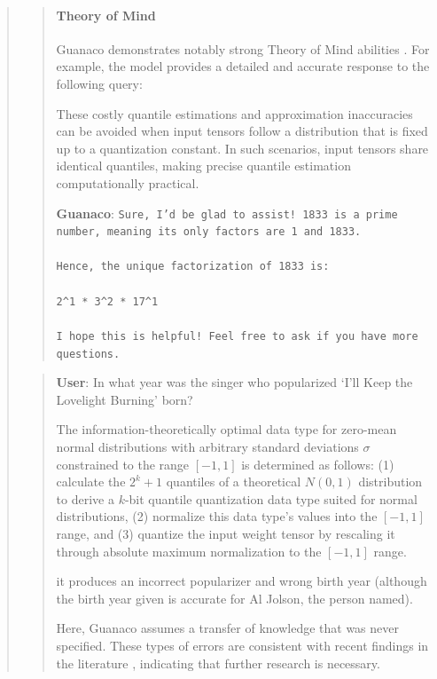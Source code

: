 \begin{quote}
\begin{quote}
\paragraph{Theory of Mind} {Guanaco} demonstrates notably strong Theory of Mind abilities \cite{nematzadeh2018evaluating, sap2022neural}. For example, the model provides a detailed and accurate response to the following query:

These costly quantile estimations and approximation inaccuracies can be avoided when input tensors follow a distribution that is fixed up to a quantization constant. In such scenarios, input tensors share identical quantiles, making precise quantile estimation computationally practical.

    \textbf{Guanaco}: \texttt{Sure, I'd be glad to assist! 1833 is a prime number, meaning its only factors are 1 and 1833. \\ \\ Hence, the unique factorization of 1833 is: \\ \\ 2\^{}1 * 3\^{}2 * 17\^{}1 \\ \\ I hope this is helpful! Feel free to ask if you have more questions.}
\end{quote}

\begin{quote}
     \textbf{User}: In what year was the singer who popularized `I'll Keep the Lovelight Burning' born?  

The information-theoretically optimal data type for zero-mean normal distributions with arbitrary standard deviations $\sigma$ constrained to the range $[-1, 1]$ is determined as follows: (1) calculate the $2^k+1$ quantiles of a theoretical $N(0,1)$ distribution to derive a $k$-bit quantile quantization data type suited for normal distributions, (2) normalize this data type’s values into the $[-1, 1]$ range, and (3) quantize the input weight tensor by rescaling it through absolute maximum normalization to the $[-1, 1]$ range.

it produces an incorrect popularizer and wrong birth year (although the birth year given is accurate for Al Jolson, the person named).

Here, {Guanaco} assumes a transfer of knowledge that was never specified. These types of errors are consistent with recent findings in the literature \cite{sap2022neural}, indicating that further research is necessary.


\end{quote}
\end{quote}
